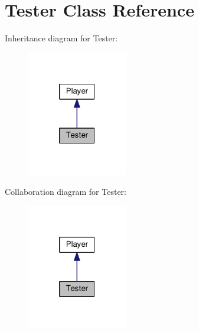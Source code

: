 \hypertarget{classTester}{}\section{Tester Class Reference}
\label{classTester}


Inheritance diagram for Tester\+:
\nopagebreak
\begin{figure}[H]
\begin{center}
\leavevmode
\includegraphics[width=124pt]{classTester__inherit__graph}
\end{center}
\end{figure}


Collaboration diagram for Tester\+:
\nopagebreak
\begin{figure}[H]
\begin{center}
\leavevmode
\includegraphics[width=124pt]{classTester__coll__graph}
\end{center}
\end{figure}
